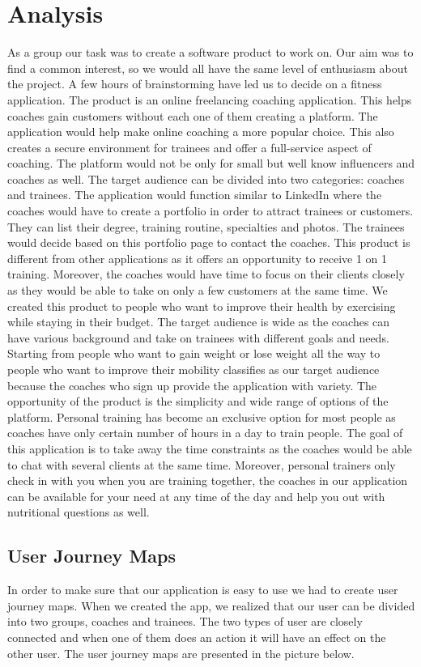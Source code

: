 \section{Analysis}

As a group our task was to create a software product to work on. Our aim was to find a common interest, so we would all have the same level of enthusiasm about the project. A few hours of brainstorming have led us to decide on a fitness application.
The product is an online freelancing coaching application. This helps coaches gain customers without each one of them creating a platform. The application would help make online coaching a more popular choice. This also creates a secure environment for trainees and offer a full-service aspect of coaching. The platform would not be only for small but well know influencers and coaches as well. The target audience can be divided into two categories: coaches and trainees. The application would function similar to LinkedIn where the coaches would have to create a portfolio in order to attract trainees or customers. They can list their degree, training routine, specialties and photos. The trainees would decide based on this portfolio page to contact the coaches.
This product is different from other applications as it offers an opportunity to receive 1 on 1 training. Moreover, the coaches would have time to focus on their clients closely as they would be able to take on only a few customers at the same time.
We created this product to people who want to improve their health by exercising while staying in their budget. The target audience is wide as the coaches can have various background and take on trainees with different goals and needs. Starting from people who want to gain weight or lose weight all the way to people who want to improve their mobility classifies as our target audience because the coaches who sign up provide the application with variety.
The opportunity of the product is the simplicity and wide range of options of the platform. Personal training has become an exclusive option for most people as coaches have only certain number of hours in a day to train people. The goal of this application is to take away the time constraints as the coaches would be able to chat with several clients at the same time. Moreover, personal trainers only check in with you when you are training together, the coaches in our application can be available for your need at any time of the day and help you out with nutritional questions as well.

\subsection{User Journey Maps}
\label{sec:UserJourneyMaps}
In order to make sure that our application is easy to use we had to create user journey maps. When we created the app, we realized that our user can be divided into two groups, coaches and trainees. The two types of user are closely connected and when one of them does an action it will have an effect on the other user. The user journey maps are presented in the picture below.

